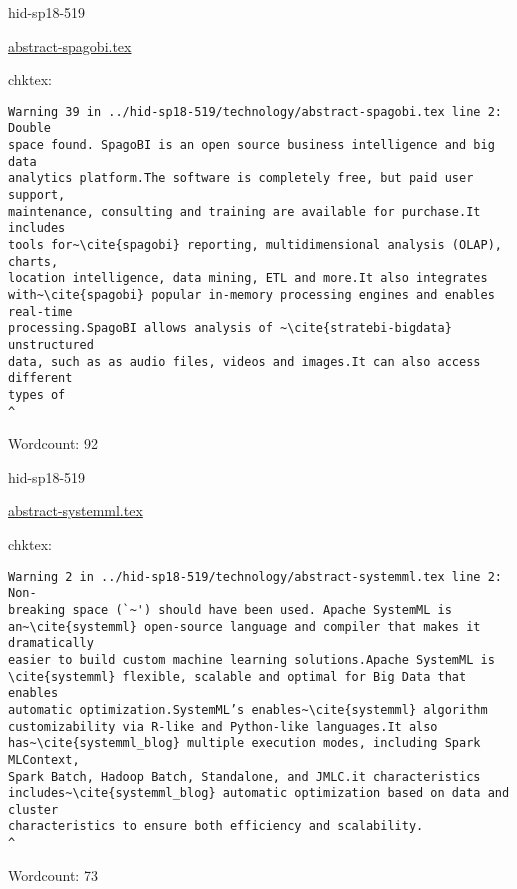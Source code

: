 

\begin{IU}

hid-sp18-519

\href{https://github.com/cloudmesh-community/hid-sp18-519/blob/master//technology/abstract-spagobi.tex}{abstract-spagobi.tex}

 
chktex:
\begin{tiny}
\begin{verbatim}
Warning 39 in ../hid-sp18-519/technology/abstract-spagobi.tex line 2: Double
space found. SpagoBI is an open source business intelligence and big data
analytics platform.The software is completely free, but paid user support,
maintenance, consulting and training are available for purchase.It includes
tools for~\cite{spagobi} reporting, multidimensional analysis (OLAP), charts,
location intelligence, data mining, ETL and more.It also integrates
with~\cite{spagobi} popular in-memory processing engines and enables real-time
processing.SpagoBI allows analysis of ~\cite{stratebi-bigdata} unstructured
data, such as as audio files, videos and images.It can also access different
types of
^
\end{verbatim}
\end{tiny}

Wordcount: 92

\end{IU}



\begin{IU}

hid-sp18-519

\href{https://github.com/cloudmesh-community/hid-sp18-519/blob/master//technology/abstract-systemml.tex}{abstract-systemml.tex}

 
chktex:
\begin{tiny}
\begin{verbatim}
Warning 2 in ../hid-sp18-519/technology/abstract-systemml.tex line 2: Non-
breaking space (`~') should have been used. Apache SystemML is
an~\cite{systemml} open-source language and compiler that makes it dramatically
easier to build custom machine learning solutions.Apache SystemML is
\cite{systemml} flexible, scalable and optimal for Big Data that enables
automatic optimization.SystemML’s enables~\cite{systemml} algorithm
customizability via R-like and Python-like languages.It also
has~\cite{systemml_blog} multiple execution modes, including Spark MLContext,
Spark Batch, Hadoop Batch, Standalone, and JMLC.it characteristics
includes~\cite{systemml_blog} automatic optimization based on data and cluster
characteristics to ensure both efficiency and scalability.
^
\end{verbatim}
\end{tiny}

Wordcount: 73

\end{IU}

